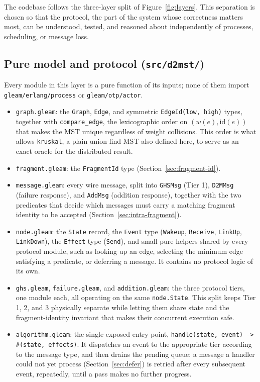 The codebase follows the three-layer split of Figure~\ref{fig:layers}. This separation is
chosen so that the protocol, the part of the system whose correctness matters most, can be
understood, tested, and reasoned about independently of processes, scheduling, or message
loss.

\subsection{Pure model and protocol (\texttt{src/d2mst/})}

Every module in this layer is a pure function of its inputs; none of them import
\texttt{gleam/erlang/process} or \texttt{gleam/otp/actor}.

\begin{itemize}
  \item \texttt{graph.gleam}: the \texttt{Graph}, \texttt{Edge}, and symmetric
  \texttt{EdgeId(low, high)} types, together with \texttt{compare\_edge}, the
  lexicographic order on $(w(e), \mathrm{id}(e))$ that makes the MST unique regardless of
  weight collisions. This order is what allows \texttt{kruskal}, a plain union-find MST
  also defined here, to serve as an exact oracle for the distributed result.
  \item \texttt{fragment.gleam}: the \texttt{FragmentId} type (Section~\ref{sec:fragment-id}).
  \item \texttt{message.gleam}: every wire message, split into \texttt{GHSMsg} (Tier 1),
  \texttt{D2MMsg} (failure response), and \texttt{AddMsg} (addition response), together
  with the two predicates that decide which messages must carry a matching fragment
  identity to be accepted (Section~\ref{sec:intra-fragment}).
  \item \texttt{node.gleam}: the \texttt{State} record, the \texttt{Event} type
  (\texttt{Wakeup}, \texttt{Receive}, \texttt{LinkUp}, \texttt{LinkDown}), the
  \texttt{Effect} type (\texttt{Send}), and small pure helpers shared by every protocol
  module, such as looking up an edge, selecting the minimum edge satisfying a predicate,
  or deferring a message. It contains no protocol logic of its own.
  \item \texttt{ghs.gleam}, \texttt{failure.gleam}, and \texttt{addition.gleam}: the three
  protocol tiers, one module each, all operating on the same \texttt{node.State}. This
  split keeps Tier 1, 2, and 3 physically separate while letting them share state and the
  fragment-identity invariant that makes their concurrent execution safe.
  \item \texttt{algorithm.gleam}: the single exposed entry point,
  \texttt{handle(state, event) -> \#(state, effects)}. It dispatches an event to the
  appropriate tier according to the message type, and then drains the pending queue: a
  message a handler could not yet process (Section~\ref{sec:defer}) is retried after every
  subsequent event, repeatedly, until a pass makes no further progress.
\end{itemize}

